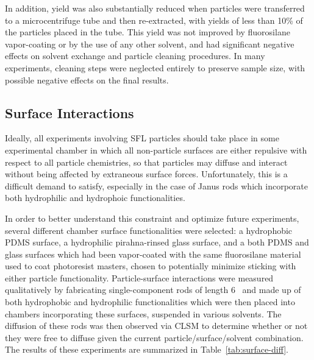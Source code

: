 In addition, yield was also substantially reduced when particles were transferred to a microcentrifuge tube
and then re-extracted, with yields of less than 10\% of the particles placed in the tube.  This yield was
not improved by fluorosilane vapor-coating or by the use of any other solvent, and had significant
negative effects on solvent exchange and particle cleaning procedures.  In many experiments, cleaning 
steps were neglected entirely to preserve sample size, with possible negative effects on the final results.

\subsection{Surface Interactions}
\label{sec:surface-interact}

Ideally, all experiments involving SFL particles should take place in some experimental
chamber in which all non-particle surfaces are either repulsive with respect to all
particle chemistries, so that particles may diffuse and interact without 
being affected by extraneous surface forces.  Unfortunately, this is a difficult demand to 
satisfy, especially in the case of Janus rods which incorporate both hydrophilic and 
hydrophoic functionalities. 

In order to better understand this constraint and optimize future experiments, several different 
chamber surface
functionalities were selected: a hydrophobic PDMS surface, a hydrophilic pirahna-rinsed glass surface,
and a both PDMS and glass surfaces which had been vapor-coated with the same fluorosilane material used
to coat photoresist masters, chosen to potentially minimize sticking with either particle functionality.
Particle-surface interactions were measured qualitatively by fabricating single-component rods
of length 6 \microns~and made up of both
hydrophobic and hydrophilic functionalities which were then placed into chambers incorporating these
surfaces, suspended in various solvents.  The diffusion of these rods was then observed via CLSM to 
determine whether or not they were free to diffuse given the current particle/surface/solvent combination.
The results of these experiments are summarized in Table~\ref{tab:surface-diff}.

